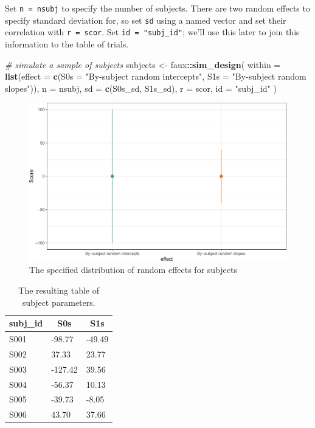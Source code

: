 \documentclass[man,floatsintext]{apa6}
\newenvironment{Shaded}{\begin{snugshade}}{\end{snugshade}}
\newcommand{\CommentTok}[1]{\textcolor[rgb]{0.56,0.35,0.01}{\textit{#1}}}
\newcommand{\DataTypeTok}[1]{\textcolor[rgb]{0.13,0.29,0.53}{#1}}
\newcommand{\KeywordTok}[1]{\textcolor[rgb]{0.13,0.29,0.53}{\textbf{#1}}}
\newcommand{\NormalTok}[1]{#1}
\newcommand{\OperatorTok}[1]{\textcolor[rgb]{0.81,0.36,0.00}{\textbf{#1}}}
\newcommand{\StringTok}[1]{\textcolor[rgb]{0.31,0.60,0.02}{#1}}
\begin{document}
Set \texttt{n\ =\ nsubj} to specify the number of subjects. There are two random effects to specify standard deviation for, so set \texttt{sd} using a named vector and set their correlation with \texttt{r = scor}. Set \texttt{id\ =\ "subj\_id"}; we'll use this later to join this information to the table of trials.

\begin{Shaded}
\begin{Highlighting}[]
\CommentTok{# simulate a sample of subjects}
\NormalTok{subjects <-}\StringTok{ }\NormalTok{faux}\OperatorTok{::}\KeywordTok{sim_design}\NormalTok{(}
  \DataTypeTok{within =} \KeywordTok{list}\NormalTok{(}\DataTypeTok{effect =} \KeywordTok{c}\NormalTok{(}\DataTypeTok{S0s =} \StringTok{"By-subject random intercepts"}\NormalTok{, }
                           \DataTypeTok{S1s =} \StringTok{"By-subject random slopes"}\NormalTok{)), }
  \DataTypeTok{n =}\NormalTok{ nsubj,}
  \DataTypeTok{sd =} \KeywordTok{c}\NormalTok{(S0s_sd, S1s_sd), }
  \DataTypeTok{r =}\NormalTok{ scor,}
  \DataTypeTok{id =} \StringTok{"subj_id"}
\NormalTok{)}
\end{Highlighting}
\end{Shaded}

\begin{figure}

{\centering \includegraphics[width=0.75\linewidth]{images/sim-subjects-1} 

}

\caption{The specified distribution of random effects for subjects}\label{fig:sim-subjects}
\end{figure}

\begin{table}[H]
\begin{center}
\begin{threeparttable}
\caption{\label{tab:subj-table}The resulting table of subject parameters.}
\begin{tabular}{lll}
\toprule
subj\_id & \multicolumn{1}{c}{S0s} & \multicolumn{1}{c}{S1s}\\
\midrule
S001 & -98.77 & -49.49\\
S002 & 37.33 & 23.77\\
S003 & -127.42 & 39.56\\
S004 & -56.37 & 10.13\\
S005 & -39.73 & -8.05\\
S006 & 43.70 & 37.66\\
\bottomrule
\end{tabular}
\end{threeparttable}
\end{center}
\end{table}
\end{document}
